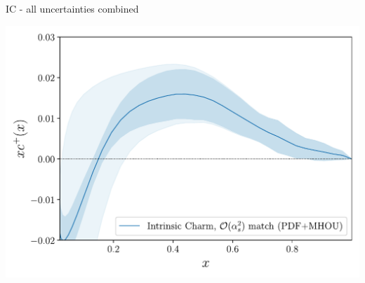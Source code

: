 \documentclass[9pt]{beamer}
\begin{document}
\begin{frame}{IC - all uncertainties combined}
	\begin{center}
		\includegraphics[width=\linewidth]{3fns_Quad_MHOU.pdf}
	\end{center}
\end{frame}
\end{document}
